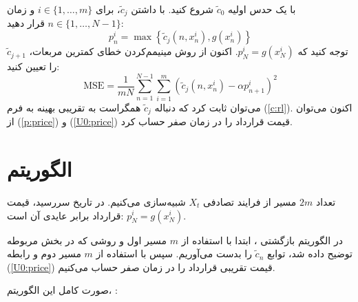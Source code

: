 \documentclass[hidelinks, 11pt]{article}
\begin{document}
با یک حدس اولیه \(\widetilde{c}_{0}\) شروع کنید.  با داشتن
\(\widetilde{c}_{j}\)، برای \(i\in\{1,\dots,m\}\) و زمان
\(n\in\{1,\dots,N-1\}\) قرار دهید:
\begin{equation*}
	p_{n}^{i} = \max \left\{\widetilde{c}_{j}(n,x_{n}^{i}), g(x_{n}^{i})\right\}
\end{equation*}
توجه کنید که \(p_{N}^{i}=g(x_{N}^{i})\).  اکنون از روش مینیمم‌کردن خطای
کمترین مربعات، \(\widetilde{c}_{j+1}\) را تعیین کنید:
\begin{equation*}
	\mathrm{MSE} =
	  \frac{1}{m N} \sum_{n=1}^{N-1} \sum_{i=1}^{m}
	     \left( \widetilde{c}_{j}(n, x_{n}^{i})-\alpha p_{n+1}^{i} \right)^{2}
\end{equation*}
می‌توان ثابت کرد
که دنباله \(\widetilde{c}_{j}\) همگراست به تقریبی بهینه
به فرم (\ref{c:rl}).  اکنون می‌توان از (\ref{p:price}) و
(\ref{U0:price}) قیمت قرارداد را در زمان صفر حساب کرد.

\section{الگوریتم}
\label{sec:orgc543956}

تعداد \(2m\) مسیر از فرایند تصادفی \(X_{t}\) شبیه‌سازی می‌کنیم.
در تاریخ سررسید، قیمت قرارداد برابر عایدی آن است:
\(p_{N}^{i}=g(x_{N}^{i})\).

در الگوریتم بازگشتی ، ابتدا با استفاده از \(m\) مسیر اول
و روشی که در بخش مربوطه توضیح داده شد، توابع \(\widetilde{c}_{n}\) را
بدست می‌آوریم.  سپس با استفاده از \(m\) مسیر دوم و رابطه
(\ref{U0:price}) قیمت تقریبی قرارداد را در زمان صفر حساب می‌کنیم.

صورت کامل این الگوریتم،
:
\end{document}
